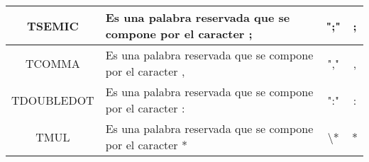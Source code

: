 \documentclass[12pt,a4paper, landscape]{article}
\theoremstyle{mytheor}
\begin{document}
\begin{longtable}[c]{|c|c|c|c|}
TSEMIC       & \multicolumn{1}{l|}{Es una palabra reservada que se compone por el caracter ;}                                                                                                                                                                                                                                                                                                                              & ";"                                                                 & ;                                                                                                                                                                                                                                                \\ \hline
TCOMMA       & \multicolumn{1}{l|}{Es una palabra reservada que se compone por el caracter ,}                                                                                                                                                                                                                                                                                                                              & ","                                                                 & ,                                                                                                                                                                                                                                                \\ \hline
TDOUBLEDOT   & \multicolumn{1}{l|}{Es una palabra reservada que se compone por el caracter :}                                                                                                                                                                                                                                                                                                                              & ":"                                                                 & :                                                                                                                                                                                                                                                \\ \hline
TMUL         & \multicolumn{1}{l|}{Es una palabra reservada que se compone por el caracter *}                                                                                                                                                                                                                                                                                                                              & \textbackslash{}*                                                   & *                                                                                                                                                                                                                                                \\ \hline

\end{longtable}
\end{document}
